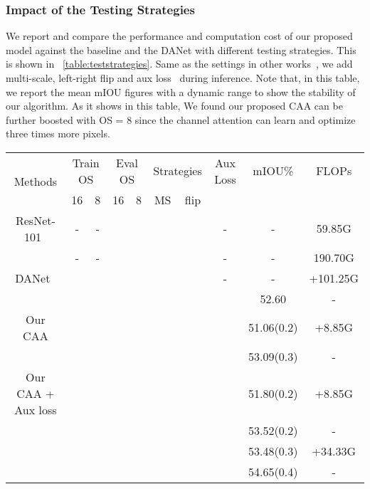 \documentclass[journal]{IEEEtran}
\begin{document}
\subsubsection{Impact of the Testing Strategies} 
We report and compare the performance and computation cost of our proposed model against the baseline and the DANet with different testing strategies. This is shown in \tablename{~\ref{table:teststrategies}}. 
Same as the settings in other works~\cite{cPSPNet, cDualAttention}, we add multi-scale, left-right flip and aux loss~\cite{cPSPNet, cDualAttention} during inference. 
Note that, in this table, we report the mean mIOU figures with a dynamic range to show the stability of our algorithm.
As it shows in this table, We found  our proposed CAA can be further boosted with OS = 8 since the channel attention can learn and optimize three times more pixels.
\\

\begin{table*}[t]
	\centering
	\caption{Comparison results with different testing strategies. 
\textbf{Train OS:} Output stride in training. \textbf{Eval OS:} Output stride in inference. \textbf{MS:} Apply multi-scale during inference. \textbf{Aux loss:} Add auxiliary loss during training.
		``'' refers to the FLOPS over the baseline FLOPS of ResNet-101. }
	\begin{tabular}{c|cc|cc|cc|c|c|c} 
		\toprule[1pt]
		\multirow{2}{*}{Methods} & \multicolumn{2}{c|}{Train OS} & \multicolumn{2}{c|}{Eval OS} & \multicolumn{2}{c|}{Strategies} &Aux Loss & mIOU\% & FLOPs   \\
		& 16 & 8 & 16 & 8 & MS & flip & & & \\ 
		\midrule[0.5pt]
		\midrule[0.5pt]
		ResNet-101~\cite{cResnet} & - & - & \checkmark &  &  &  & - & - & 59.85G \\
		& - & - &  & \checkmark &  &  & - & - & 190.70G  \\
		\midrule
		DANet~\cite{cDualAttention}  &           & \checkmark &           & \checkmark &    &     & - & -    & +101.25G\\ 
		&           & \checkmark &           & \checkmark & \checkmark & \checkmark  & \checkmark &52.60 & -   \\ 
		\midrule
		Our CAA           & \checkmark &     & \checkmark &         &         &      &     & 51.06(0.2)&  +8.85G\\
		& \checkmark &          & \checkmark &    & \checkmark    & \checkmark   &   &53.09(0.3)      & -  \\
		\midrule
		Our CAA  + Aux loss     & \checkmark &       & \checkmark &     &     &      & \checkmark & 51.80(0.2)&  +8.85G\\
		& \checkmark &       & \checkmark &     &\checkmark&\checkmark& \checkmark & 53.52(0.2)& - \\
		&  &\checkmark&           & \checkmark   &              &       & \checkmark& 53.48(0.3)   & +34.33G\\
		&  &\checkmark        &           & \checkmark   & \checkmark    & \checkmark   &\checkmark &54.65(0.4)      & - \\
		\bottomrule[1pt]
	\end{tabular}
	\label{table:teststrategies}
\end{table*}
\end{document}
